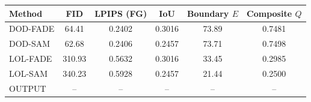 \begin{tabularx}{\linewidth}{|l|c|c|c|c|c|}
\hline
Method & FID & LPIPS (FG) & IoU & Boundary $E$ & Composite $Q$ \\
\hline
DOD-FADE & 64.41 & 0.2402 & 0.3016 & 73.89 & 0.7481 \\
DOD-SAM & 62.68 & 0.2406 & 0.2457 & 73.71 & 0.7498 \\
LOL-FADE & 310.93 & 0.5632 & 0.3016 & 33.45 & 0.2985 \\
LOL-SAM & 340.23 & 0.5928 & 0.2457 & 21.44 & 0.2500 \\
OUTPUT & -- & -- & -- & -- & -- \\
\hline
\end{tabularx}